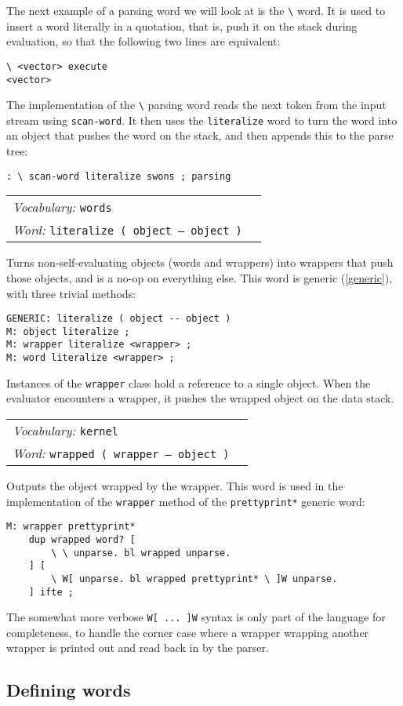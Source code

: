 \documentclass{book}
\newcommand{\vocabulary}[1]{\emph{Vocabulary:} \texttt{#1}&\\}
\newcommand{\ordinaryword}[2]{\index{\texttt{#1}}\emph{Word:} \texttt{#2}&\\}
\newcommand{\wordtable}[1]{


\begin{tabularx}{12cm}{lX}
\hline
#1
\hline
\end{tabularx}

}
\begin{document}
The next example of a parsing word we will look at is the \verb|\| word. It is used to insert a word literally in a quotation, that is, push it on the stack during evaluation, so that the following two lines are equivalent:
\begin{verbatim}
\ <vector> execute
<vector>
\end{verbatim}
The implementation of the \verb|\| parsing word reads the next token from the input stream using \verb|scan-word|.
It then uses the \verb|literalize| word to turn the word into an object that pushes the word
on the stack, and then appends this to the parse tree:
\begin{verbatim}
: \ scan-word literalize swons ; parsing
\end{verbatim}

\wordtable{
\vocabulary{words}
\ordinaryword{literalize}{literalize ( object -- object )}
}
Turns non-self-evaluating objects (words and wrappers) into wrappers that push those objects, and is a no-op on everything else. This word is generic (\ref{generic}), with three trivial methods:
\begin{verbatim}
GENERIC: literalize ( object -- object )
M: object literalize ;
M: wrapper literalize <wrapper> ;
M: word literalize <wrapper> ;
\end{verbatim}

\wrapglos

Instances of the \verb|wrapper| class hold a reference to a single object. When the evaluator encounters a wrapper, it pushes the wrapped object on the data stack.

\wordtable{
\vocabulary{kernel}
\ordinaryword{wrapped}{wrapped ( wrapper -- object )}
}
Outputs the object wrapped by the wrapper. This word is used in the implementation of the \verb|wrapper| method of the \verb|prettyprint*| generic word:
\begin{verbatim}
M: wrapper prettyprint* 
    dup wrapped word? [
        \ \ unparse. bl wrapped unparse. 
    ] [
        \ W[ unparse. bl wrapped prettyprint* \ ]W unparse. 
    ] ifte ;
\end{verbatim}
The somewhat more verbose \verb|W[ ... ]W| syntax is only part of the language for completeness, to handle the corner case where a wrapper wrapping another wrapper is printed out and read back in by the parser.

\subsection{Defining words}
\end{document}
